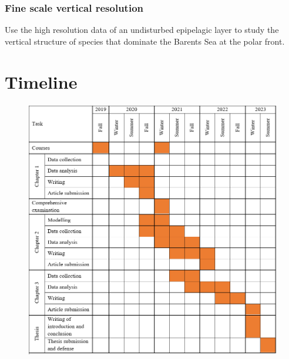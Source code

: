 \documentclass[a4paper, 12pt, Ariel]{article}
\begin{document}
\subsubsection {Fine scale vertical resolution}
Use the high resolution data of an undisturbed epipelagic layer to study the vertical structure of species that dominate the Barents Sea at the polar front.


\section{Timeline}

\begin{figure}[H]
	\centering
	\includegraphics[width=\textwidth]{timeline.png}
\end{figure}






\end{document}
